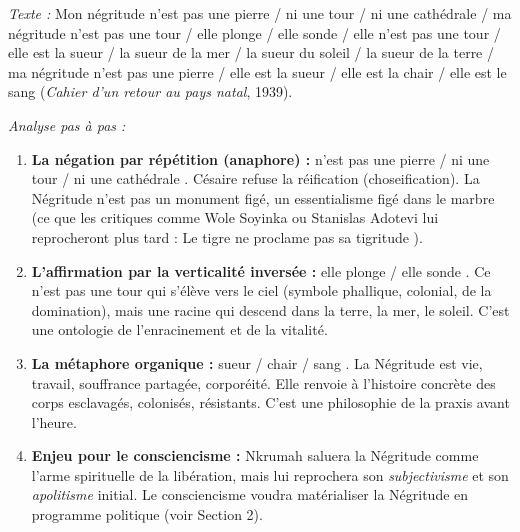 \documentclass[11pt]{article}
\newcommand{\cle}[1]{{\popxbold\color{popdark}#1}}
\begin{document}
\begin{experience}
\emph{Texte :} \guillemotleft Mon négritude n'est pas une pierre / ni une tour / ni une cathédrale / ma négritude n'est pas une tour / elle plonge / elle sonde / elle n'est pas une tour / elle est la sueur / la sueur de la mer / la sueur du soleil / la sueur de la terre / ma négritude n'est pas une pierre / elle est la sueur / elle est la chair / elle est le sang \guillemotright (\emph{Cahier d'un retour au pays natal}, 1939).

\emph{Analyse pas à pas :}
\begin{enumerate}
    \item \textbf{La négation par répétition (anaphore) :} \guillemotleft n'est pas une pierre / ni une tour / ni une cathédrale \guillemotright. Césaire refuse la \cle{réification} (choseification). La Négritude n'est pas un monument figé, un essentialisme figé dans le marbre (ce que les critiques comme Wole Soyinka ou Stanislas Adotevi lui reprocheront plus tard : \guillemotleft Le tigre ne proclame pas sa tigritude \guillemotright).
    \item \textbf{L'affirmation par la verticalité inversée :} \guillemotleft elle plonge / elle sonde \guillemotright. Ce n'est pas une tour qui s'élève vers le ciel (symbole phallique, colonial, de la domination), mais une racine qui descend dans la terre, la mer, le soleil. C'est une \cle{ontologie de l'enracinement} et de la vitalité.
    \item \textbf{La métaphore organique :} \guillemotleft sueur / chair / sang \guillemotright. La Négritude est vie, travail, souffrance partagée, corporéité. Elle renvoie à l'histoire concrète des corps esclavagés, colonisés, résistants. C'est une \cle{philosophie de la praxis} avant l'heure.
    \item \textbf{Enjeu pour le consciencisme :} Nkrumah saluera la Négritude comme \guillemotleft l'arme spirituelle \guillemotright de la libération, mais lui reprochera son \emph{subjectivisme} et son \emph{apolitisme} initial. Le consciencisme voudra \guillemotleft matérialiser \guillemotright la Négritude en programme politique (voir Section 2).
\end{enumerate}
\end{experience}
\end{document}
